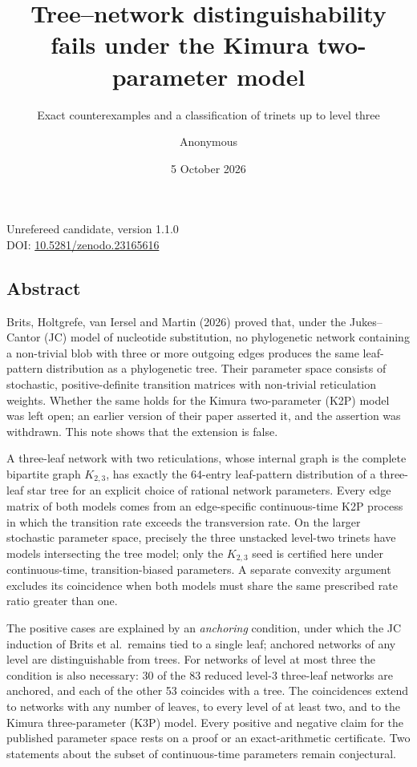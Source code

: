 \documentclass[
  11pt,
]{article}
\title{Tree--network distinguishability fails under the Kimura
two-parameter model}
\subtitle{Exact counterexamples and a classification of trinets up to
level three}
\author{Anonymous}
\date{5 October 2026}
\begin{document}
\maketitle
\begin{center}Unrefereed candidate, version 1.1.0\\ DOI: \href{https://doi.org/10.5281/zenodo.23165616}{10.5281/zenodo.23165616}\end{center}

\subsection{Abstract}\label{abstract}

Brits, Holtgrefe, van Iersel and Martin (2026) proved that, under the
Jukes--Cantor (JC) model of nucleotide substitution, no phylogenetic
network containing a non-trivial blob with three or more outgoing edges
produces the same leaf-pattern distribution as a phylogenetic tree.
Their parameter space consists of stochastic, positive-definite
transition matrices with non-trivial reticulation weights. Whether the
same holds for the Kimura two-parameter (K2P) model was left open; an
earlier version of their paper asserted it, and the assertion was
withdrawn. This note shows that the extension is false.

A three-leaf network with two reticulations, whose internal graph is the
complete bipartite graph \(K_{2,3}\), has exactly the 64-entry
leaf-pattern distribution of a three-leaf star tree for an explicit
choice of rational network parameters. Every edge matrix of both models
comes from an edge-specific continuous-time K2P process in which the
transition rate exceeds the transversion rate. On the larger stochastic
parameter space, precisely the three unstacked level-two trinets have
models intersecting the tree model; only the \(K_{2,3}\) seed is
certified here under continuous-time, transition-biased parameters. A
separate convexity argument excludes its coincidence when both models
must share the same prescribed rate ratio greater than one.

The positive cases are explained by an \emph{anchoring} condition, under
which the JC induction of Brits et al.~remains tied to a single leaf;
anchored networks of any level are distinguishable from trees. For
networks of level at most three the condition is also necessary: 30 of
the 83 reduced level-3 three-leaf networks are anchored, and each of the
other 53 coincides with a tree. The coincidences extend to networks with
any number of leaves, to every level of at least two, and to the Kimura
three-parameter (K3P) model. Every positive and negative claim for the
published parameter space rests on a proof or an exact-arithmetic
certificate. Two statements about the subset of continuous-time
parameters remain conjectural.
\end{document}
